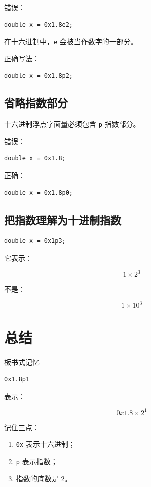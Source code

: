 \documentclass[UTF8,12pt,a4paper]{ctexart}
\begin{document}
错误：

\begin{lstlisting}
double x = 0x1.8e2;
\end{lstlisting}

在十六进制中，\texttt{e} 会被当作数字的一部分。

正确写法：

\begin{lstlisting}
double x = 0x1.8p2;
\end{lstlisting}

\subsection{省略指数部分}

十六进制浮点字面量必须包含 \texttt{p} 指数部分。

错误：

\begin{lstlisting}
double x = 0x1.8;
\end{lstlisting}

正确：

\begin{lstlisting}
double x = 0x1.8p0;
\end{lstlisting}

\subsection{把指数理解为十进制指数}

\begin{lstlisting}
double x = 0x1p3;
\end{lstlisting}

它表示：

\[
1 \times 2^3
\]

不是：

\[
1 \times 10^3
\]



\section{总结}

\begin{conceptbox}{板书式记忆}
\begin{lstlisting}
0x1.8p1
\end{lstlisting}

表示：

\[
0x1.8 \times 2^1
\]

记住三点：

\begin{enumerate}[label=\arabic*.]
    \item \texttt{0x} 表示十六进制；
    \item \texttt{p} 表示指数；
    \item 指数的底数是 2。
\end{enumerate}
\end{conceptbox}
\end{document}
